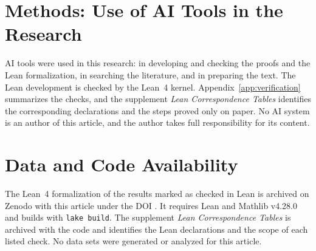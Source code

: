 
\section*{Methods: Use of AI Tools in the Research}
AI tools were used in this research: in developing and checking the
proofs and the Lean formalization, in searching the literature, and in
preparing the text. The Lean development is checked by the Lean~4
kernel. Appendix~\ref{app:verification} summarizes the checks, and the
supplement \emph{Lean Correspondence Tables} identifies the corresponding
declarations and the steps proved only on paper. No AI system is an author of this
article, and the author takes full responsibility for its content.

\section*{Data and Code Availability}
The Lean~4 formalization of the results marked as checked in Lean is
archived on Zenodo with this article under the DOI
\href{https://doi.org/\archivedoi}{\archivedoi}.
It requires Lean and Mathlib v4.28.0 and builds with \texttt{lake build}.
The supplement \emph{Lean Correspondence Tables} is archived with the
code and identifies the Lean declarations and the scope of each listed
check. No data sets were generated or analyzed for this article.
